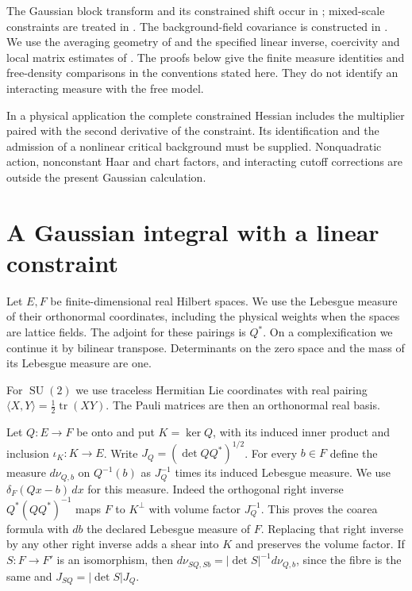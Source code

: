\documentclass[11pt,letterpaper,reqno]{amsart}
\numberwithin{equation}{section}
\theoremstyle{definition}
\theoremstyle{remark}
\begin{document}
The Gaussian block transform and its constrained shift occur in
\cite[\S\S A--B, D]{Bal84a}; mixed-scale constraints are treated
in \cite[\S A]{Bal84b}. The background-field covariance is
constructed in \cite[\S E, Theorem~3.15]{Bal85p}. We use the
averaging geometry of \cite{BA} and the specified linear inverse,
coercivity and local matrix estimates of \cite{MB}. The proofs
below give the finite measure identities and free-density
comparisons in the conventions stated here. They do not identify
an interacting measure with the free model.

In a physical application the complete constrained Hessian includes
the multiplier paired with the second derivative of the constraint.
Its identification and the admission of a nonlinear critical
background must be supplied. Nonquadratic action, nonconstant
Haar and chart factors, and interacting cutoff corrections are
outside the present Gaussian calculation.

\section{A Gaussian integral with a linear constraint}
\label{gi:sec-real-gaussian}

Let \(E,F\) be finite-dimensional real Hilbert spaces. We use
the Lebesgue measure of their orthonormal coordinates, including
the physical weights when the spaces are lattice fields. The
adjoint for these pairings is \(Q^*\). On a complexification
we continue it by bilinear transpose. Determinants on the zero
space and the mass of its Lebesgue measure are one.

For $\operatorname{SU}(2)$ we use traceless Hermitian Lie
coordinates with real pairing
$\langle X,Y\rangle=\tfrac12\operatorname{tr}(XY)$.
The Pauli matrices are then an orthonormal real basis.

Let \(Q:E\to F\) be onto and put \(K=\ker Q\), with its
induced inner product and inclusion \(\iota_K:K\to E\).
Write \(J_Q=(\det QQ^*)^{1/2}\). For every \(b\in F\)
define the measure \(d\nu_{Q,b}\) on \(Q^{-1}(b)\) as
\(J_Q^{-1}\) times its induced Lebesgue measure. We use
\(\delta_F(Qx-b)\,dx\) for this measure. Indeed the
orthogonal right inverse \(Q^*(QQ^*)^{-1}\) maps \(F\)
to \(K^\perp\) with volume factor \(J_Q^{-1}\). This
proves the coarea formula with \(db\) the declared Lebesgue
measure of \(F\). Replacing that right inverse by any
other right inverse adds a shear into \(K\) and preserves
the volume factor. If \(S:F\to F'\) is an isomorphism,
then \(d\nu_{SQ,Sb}=|\det S|^{-1}d\nu_{Q,b}\), since the
fibre is the same and \(J_{SQ}=|\det S|J_Q\).
\end{document}
